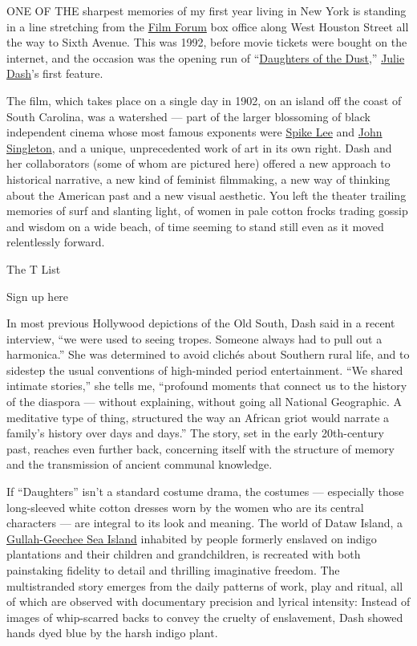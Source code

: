 ONE OF THE sharpest memories of my first year living in New York is
standing in a line stretching from the
\href{https://www.nytimes.com/topic/organization/film-forum}{Film Forum}
box office along West Houston Street all the way to Sixth Avenue. This
was 1992, before movie tickets were bought on the internet, and the
occasion was the opening run of
``\href{https://www.nytimes.com/watching/titles/daughters-of-the-dust}{Daughters
of the Dust},''
\href{https://www.nytimes.com/2016/11/20/movies/julie-dash-daughters-of-the-dust.html}{Julie
Dash}'s first feature.

The film, which takes place on a single day in 1902, on an island off
the coast of South Carolina, was a watershed --- part of the larger
blossoming of black independent cinema whose most famous exponents were
\href{https://www.nytimes.com/topic/person/spike-lee}{Spike Lee} and
\href{https://www.nytimes.com/2019/05/14/style/john-singleton-black-film-movies.html}{John
Singleton}, and a unique, unprecedented work of art in its own right.
Dash and her collaborators (some of whom are pictured here) offered a
new approach to historical narrative, a new kind of feminist filmmaking,
a new way of thinking about the American past and a new visual
aesthetic. You left the theater trailing memories of surf and slanting
light, of women in pale cotton frocks trading gossip and wisdom on a
wide beach, of time seeming to stand still even as it moved relentlessly
forward.

The T List \textbar{}

Sign up here

In most previous Hollywood depictions of the Old South, Dash said in a
recent interview, ``we were used to seeing tropes. Someone always had to
pull out a harmonica.'' She was determined to avoid clichés about
Southern rural life, and to sidestep the usual conventions of
high-minded period entertainment. ``We shared intimate stories,'' she
tells me, ``profound moments that connect us to the history of the
diaspora --- without explaining, without going all National Geographic.
A meditative type of thing, structured the way an African griot would
narrate a family's history over days and days.'' The story, set in the
early 20th-century past, reaches even further back, concerning itself
with the structure of memory and the transmission of ancient communal
knowledge.

If ``Daughters'' isn't a standard costume drama, the costumes ---
especially those long-sleeved white cotton dresses worn by the women who
are its central characters --- are integral to its look and meaning. The
world of Dataw Island, a
\href{https://www.nytimes.com/2019/04/15/travel/south-carolina-gullah-geechee-low-country.html}{Gullah-Geechee
Sea Island} inhabited by people formerly enslaved on indigo plantations
and their children and grandchildren, is recreated with both painstaking
fidelity to detail and thrilling imaginative freedom. The multistranded
story emerges from the daily patterns of work, play and ritual, all of
which are observed with documentary precision and lyrical intensity:
Instead of images of whip-scarred backs to convey the cruelty of
enslavement, Dash showed hands dyed blue by the harsh indigo plant.

